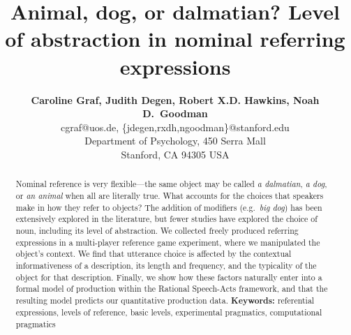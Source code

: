 \documentclass[10pt,letterpaper]{article}
\title{Animal, dog, or dalmatian? Level of abstraction in nominal referring expressions}
\author{{\large \bf Caroline Graf, Judith Degen, Robert X.D. Hawkins, Noah D.~Goodman} \\
  cgraf@uos.de, \{jdegen,rxdh,ngoodman\}@stanford.edu\\
  Department of Psychology, 450 Serra Mall \\
  Stanford, CA 94305 USA}
\newcommand{\red}[1]{\textcolor{Red}{#1}}
\begin{document}
\maketitle


\begin{abstract}


Nominal reference is very flexible---the same object may be called \emph{a dalmatian}, \emph{a dog}, or \emph{an animal} when all are literally true.
What accounts for the choices that speakers make in how they refer to objects?
The addition of modifiers (e.g.~\emph{big dog}) has been extensively explored in the literature, but fewer studies have explored the choice of noun, including its level of abstraction.
We collected freely produced referring expressions in a multi-player reference game experiment, where we manipulated the object's context.
We find that utterance choice is affected by the contextual informativeness of a description, its length and frequency, and the typicality of the object for that description.
Finally, we show how these factors naturally enter into a formal model of production within the Rational Speech-Acts framework, and that the resulting model predicts our quantitative production data.
\textbf{Keywords:} 
referential expressions, levels of reference, basic levels, experimental pragmatics, computational pragmatics
\end{abstract}
\end{document}
